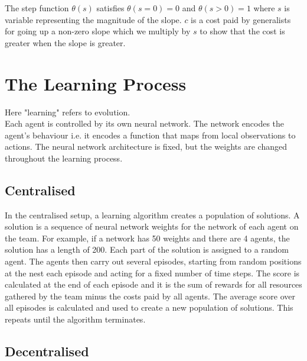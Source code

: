 \documentclass[12pt]{article}
\begin{document}
The step function $\theta(s)$ satisfies $\theta(s=0) = 0$ and $\theta(s>0)=1$ where $s$ is variable representing the magnitude of the slope.
$c$ is a cost paid by generalists for going up a non-zero slope which we multiply by $s$ to show that the cost is greater when the slope is greater.





\appendix

\section{The Learning Process}\label{learning}

Here "learning" refers to evolution.\\

Each agent is controlled by its own neural network. 
The network encodes the agent’s behaviour i.e. it encodes a function that maps from local observations to actions. 
The neural network architecture is fixed, but the weights are changed throughout the learning process.\\

\subsection{Centralised}

In the centralised setup, a learning algorithm creates a population of solutions. 
A solution is a sequence of neural network weights for the network of each agent on the team. 
For example, if a network has 50 weights and there are 4 agents, the solution has a length of 200. 
Each part of the solution is assigned to a random agent. 
The agents then carry out several episodes, starting from random positions at the nest each episode and acting for a fixed number of time steps. 
The score is calculated at the end of each episode and it is the sum of rewards for all resources gathered by the team minus the costs paid by all agents. 
The average score over all episodes is calculated and used to create a new population of solutions. 
This repeats until the algorithm terminates.\\

\subsection{Decentralised}
\end{document}
